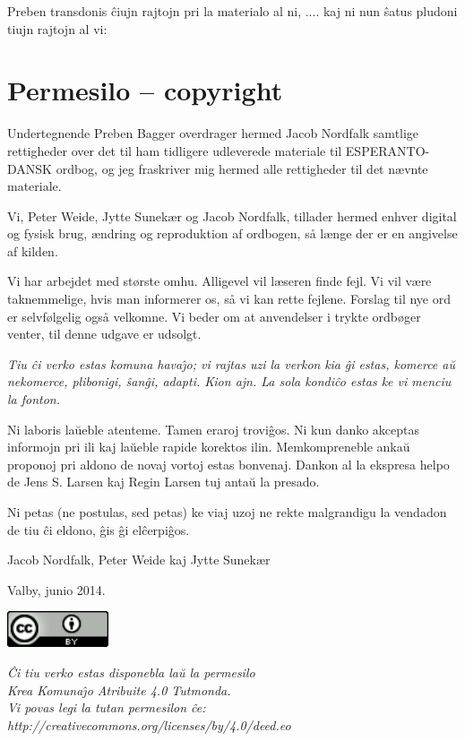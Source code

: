 {\frenchspacing
Preben transdonis \^ciujn rajtojn pri la materialo al ni, .... kaj ni
nun \^satus pludoni tiujn rajtojn al vi:}

\section{Permesilo -- copyright}
{
Undertegnende Preben Bagger overdrager hermed Jacob Nordfalk samtlige
rettigheder over det til ham tidligere udleverede materiale til
ESPERANTO-DANSK ordbog, og jeg fraskriver mig hermed alle rettigheder
til det n{\ae}vnte materiale.}

{
Vi, Peter Weide, Jytte Sunek{\ae}r og Jacob Nordfalk, tillader hermed
enhver digital og fysisk brug, {\ae}ndring og reproduktion af ordbogen,
s{\aa} l{\ae}nge der er en angivelse af kilden.}

{
Vi har arbejdet med st{\o}rste omhu. Alligevel vil l{\ae}seren finde
fejl. Vi vil v{\ae}re taknemmelige, hvis man informerer os, s{\aa} vi
kan rette fejlene. Forslag til nye ord er selvf{\o}lgelig ogs{\aa}
velkomne. Vi beder om at anvendelser i trykte ordb{\o}ger venter, til
denne udgave er udsolgt.}

{\frenchspacing
\textit{Tiu \^ci verko estas komuna hava\^{\j}o; vi rajtas uzi la verkon
}\foreignlanguage{danish}{\textit{kia}}\textit{ \^gi estas, komerce
a\u{u} nekomerce, plibonigi, \^san\^gi, adapti. Kion ajn. La sola
kondi\^co estas ke vi menci}\textit{u}\textit{ la fonton.}}

{\frenchspacing
Ni laboris la\u{u}eble atenteme. Tamen eraroj trovi\^gos. Ni kun danko
akceptas informojn pri ili kaj la\u{u}eble rapide korektos ilin.
Memkompreneble anka\u{u} proponoj pri aldono de novaj vortoj estas
bonvenaj. Dankon al la ekspresa helpo de Jens S. Larsen kaj Regin Larsen tuj anta\u{u} la presado.}

{\frenchspacing
Ni petas (ne postulas, sed petas) ke viaj uzoj ne rekte malgrandigu la
vendadon de tiu \^ci eldono, \^gis \^gi el\^cerpi\^gos.}


{
Jacob Nordfalk, Peter Weide kaj Jytte Sunek{\ae}r}

{
Valby, junio 2014.}


\begin{center}
	\includegraphics[width=3cm]{permisilo.png}
\end{center}

\begin{center}
{\frenchspacing\itshape
\^Ci tiu verko estas disponebla la\u{u} la permesilo\\
Krea Komuna\^{\j}o Atribuite 4.0 Tutmonda.\\
Vi povas legi la tutan permesilon \^ce:\\
http://creativecommons.org/licenses/by/4.0/deed.eo}
\end{center}
